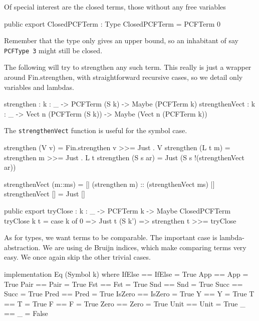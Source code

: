 Of special interest are the closed terms, those without any free variables

\begin{code}
public export
ClosedPCFTerm : Type
ClosedPCFTerm = PCFTerm 0
\end{code}

Remember that the type only gives an upper bound, so an inhabitant of say
\lstinline{PCFType 3} might still be closed.

The following will try to strengthen any such term. This really is just a
wrapper around Fin.strengthen, with straightforward recursive cases,
so we detail only variables and lambdas.

\begin{code}
strengthen : {k : _} -> PCFTerm (S k) -> Maybe (PCFTerm k)
strengthenVect : {k : _} -> Vect n (PCFTerm (S k)) -> Maybe (Vect n (PCFTerm k))
\end{code}

The \lstinline{strengthenVect} function is useful for the symbol case.

\begin{code}
strengthen (V v)    = Fin.strengthen v >>= Just . V
strengthen (L t m)  = strengthen m     >>= Just . L t
strengthen (S s ar) = Just (S s !(strengthenVect ar))

strengthenVect (m::ms) = [| (strengthen m) :: (strengthenVect ms) |]
strengthenVect []      = Just []
\end{code}

\begin{code}
public export
tryClose : {k : _} -> PCFTerm k -> Maybe ClosedPCFTerm
tryClose {k} t = case k of
                 0      => Just t
                 (S k') => strengthen t >>= tryClose
\end{code}

As for types, we want terms to be comparable. The important case is lambda-abstraction.
We are using de Bruijn indices, which make comparing terms very easy.
We once again skip the other trivial cases.

\begin{hidden}
implementation Eq (Symbol k) where
  IfElse == IfElse = True
  App    == App    = True
  Pair   == Pair   = True
  Fst    == Fst    = True
  Snd    == Snd    = True
  Succ   == Succ   = True
  Pred   == Pred   = True
  IsZero == IsZero = True
  Y      == Y      = True
  T      == T      = True
  F      == F      = True
  Zero   == Zero   = True
  Unit   == Unit   = True
  _      == _      = False
\end{hidden}

